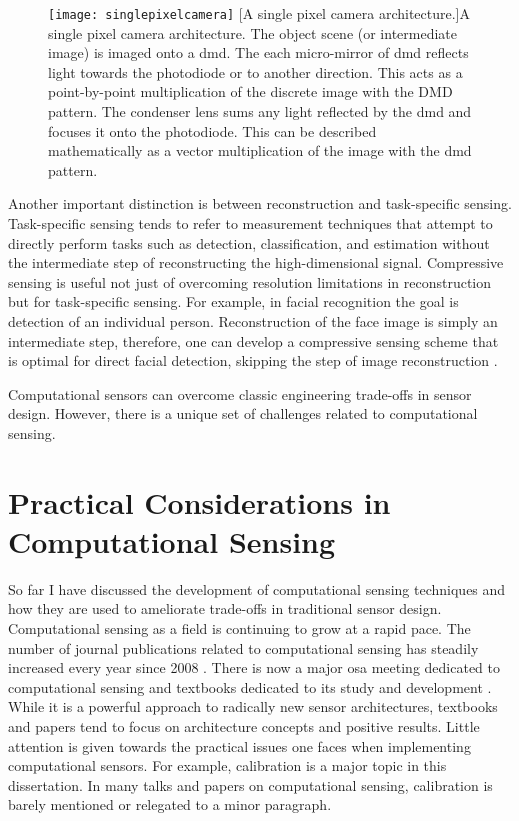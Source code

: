 \begin{figure}
    \texttt{[image: singlepixelcamera]}
    [A single pixel camera architecture.]{A single pixel camera architecture. The object scene (or intermediate image) is imaged onto a \gls{dmd}. The each micro-mirror of \gls{dmd} reflects light towards the photodiode or to another direction. This acts as a point-by-point multiplication of the discrete image with the DMD pattern. The condenser lens sums any light reflected by the \gls{dmd} and focuses it onto the photodiode. This can be described mathematically as a vector multiplication of the image with the \gls{dmd} pattern. }
    \label{fig:singlepixelcamera}
\end{figure}

Another important distinction is between reconstruction and task-specific sensing. Task-specific sensing tends to refer to measurement techniques that attempt to directly perform tasks such as detection, classification, and estimation without the intermediate step of reconstructing the high-dimensional signal. Compressive sensing is useful not just of overcoming resolution limitations in reconstruction but for task-specific sensing. For example, in facial recognition the goal is detection of an individual person. Reconstruction of the face image is simply an intermediate step, therefore, one can develop a compressive sensing scheme that is optimal for direct facial detection, skipping the step of image reconstruction \cite{pal2005face}. 

Computational sensors can overcome classic engineering trade-offs in sensor design. However, there is a unique set of challenges related to computational sensing.

\section{Practical Considerations in Computational Sensing}

So far I have discussed the development of computational sensing techniques and how they are used to ameliorate trade-offs in traditional sensor design. Computational sensing as a field is continuing to grow at a rapid pace. The number of journal publications related to computational sensing has steadily increased every year since 2008 \cite{stern2016hurdles}. There is now a major \gls{osa} meeting dedicated to computational sensing \cite{cosi2016meetingwebsite} and textbooks dedicated to its study and development \cite{brady2009optical, foucart2013mathematical}. While it is a powerful approach to radically new sensor architectures, textbooks and papers tend to focus on architecture concepts and positive results. Little attention is given towards the practical issues one faces when implementing computational sensors. For example, calibration is a major topic in this dissertation. In many talks and papers on computational sensing, calibration is barely mentioned or relegated to a minor paragraph. 

